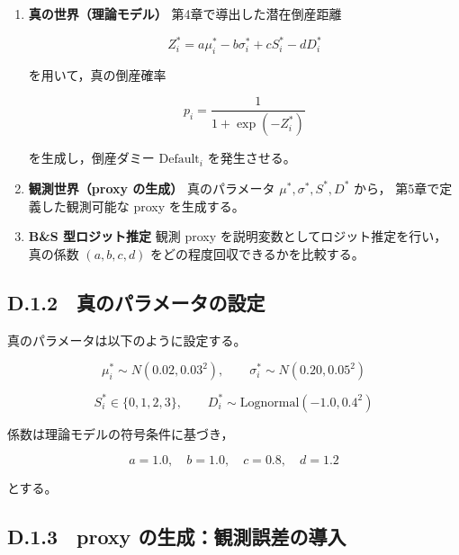 \begin{enumerate}
    \item \textbf{真の世界（理論モデル）}  
    第4章で導出した潜在倒産距離
    


\[
        Z^{\ast}_i = a \mu^{\ast}_i - b \sigma^{\ast}_i + c S^{\ast}_i - d D^{\ast}_i
    \]



    を用いて，真の倒産確率
    


\[
        p_i = \frac{1}{1 + \exp(-Z^{\ast}_i)}
    \]



    を生成し，倒産ダミー $\text{Default}_i$ を発生させる。

    \item \textbf{観測世界（proxy の生成）}  
    真のパラメータ $\mu^{\ast}, \sigma^{\ast}, S^{\ast}, D^{\ast}$ から，
    第5章で定義した観測可能な proxy を生成する。

    \item \textbf{B\&S 型ロジット推定}  
    観測 proxy を説明変数としてロジット推定を行い，
    真の係数 $(a,b,c,d)$ をどの程度回収できるかを比較する。
\end{enumerate}

\subsection*{D.1.2　真のパラメータの設定}

真のパラメータは以下のように設定する。



\[
\mu^{\ast}_i \sim N(0.02, 0.03^2), \qquad
\sigma^{\ast}_i \sim N(0.20, 0.05^2)
\]





\[
S^{\ast}_i \in \{0,1,2,3\}, \qquad
D^{\ast}_i \sim \mathrm{Lognormal}(-1.0, 0.4^2)
\]



係数は理論モデルの符号条件に基づき，



\[
a = 1.0,\quad b = 1.0,\quad c = 0.8,\quad d = 1.2
\]



とする。

\subsection*{D.1.3　proxy の生成：観測誤差の導入}

